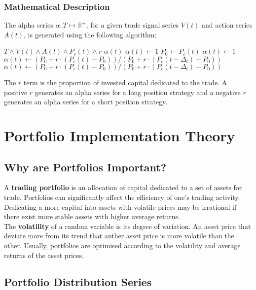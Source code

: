 \documentclass[11pt]{article}
\begin{document}
\subsubsection{Mathematical Description}

The alpha series $\alpha : T \mapsto \mathbb{R}^{+}$, for a given trade signal series $V(t)$ and action series $A(t)$, is generated using the following algorithm:

\begin{algorithmic}[1]
\REQUIRE $T \wedge V(t) \wedge A(t) \wedge P_c(t) \wedge r$
\ENSURE $\alpha(t)$
\STATE $\alpha(t) \leftarrow 1$
\STATE $P_0 \leftarrow P_c(t)$
\STATE $\alpha(t) \leftarrow 1$
\STATE $\alpha(t) \leftarrow (P_0 + r \cdot (P_c(t) - P_0))/(P_0 + r \cdot (P_c(t- \Delta_t) - P_0))$
\ENDIF
{}
\STATE $\alpha(t) \leftarrow (P_0 + r \cdot (P_c(t) - P_0))/(P_0 + r \cdot (P_c(t- \Delta_t) - P_0))$
\ENDIF
\ENDFOR
\end{algorithmic}
The $r$ term is the proportion of invested capital dedicated to the trade. A positive $r$ generates an alpha series for a long position strategy and a negative $r$ generates an alpha series for a short position strategy.

\section{Portfolio Implementation Theory}

\subsection{Why are Portfolios Important?}
A \textbf{trading portfolio} is an allocation of capital dedicated to a set of assets for trade. Portfolios can significantly affect the efficiency of one's trading activity. Dedicating a more capital into assets with volatile prices may be irrational if there exist more stable assets with higher average returns.\\

The \textbf{volatility} of a random variable is its degree of variation. An asset price that deviate more from its trend that anther asset price is more volatile than the other. Usually, portfolios are optimised according to the volatility and average returns of the asset prices.

\subsection{Portfolio Distribution Series}
\end{document}
